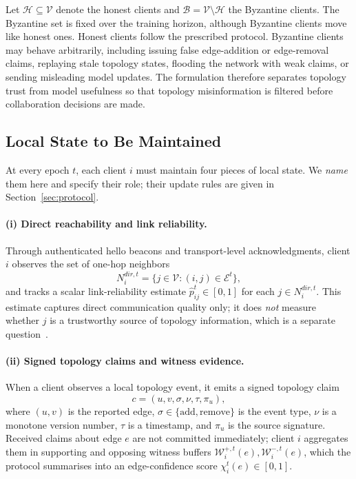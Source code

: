 \documentclass[journal]{IEEEtran}
\theoremstyle{definition}
\theoremstyle{remark}
\begin{document}
Let $\mathcal H \subseteq \mathcal V$ denote the honest clients and $\mathcal B = \mathcal V \setminus \mathcal H$ the Byzantine clients. The Byzantine set is fixed over the training horizon, although Byzantine clients move like honest ones. Honest clients follow the prescribed protocol. Byzantine clients may behave arbitrarily, including issuing false edge-addition or edge-removal claims, replaying stale topology states, flooding the network with weak claims, or sending misleading model updates. The formulation therefore separates topology trust from model usefulness so that topology misinformation is filtered before collaboration decisions are made.

\subsection{Local State to Be Maintained}
\label{sec:local_state}

At every epoch $t$, each client $i$ must maintain four pieces of local state. We \emph{name} them here and specify their role; their update rules are given in Section~\ref{sec:protocol}.

\paragraph{(i) Direct reachability and link reliability.}
Through authenticated hello beacons and transport-level acknowledgments, client $i$ observes the set of one-hop neighbors
$$
N_i^{dir,t} = \{j\in\mathcal V : (i,j)\in\mathcal E^t\},
$$
and tracks a scalar link-reliability estimate $\hat p_{ij}^t \in [0,1]$ for each $j\in N_i^{dir,t}$. This estimate captures direct communication quality only; it does \emph{not} measure whether $j$ is a trustworthy source of topology information, which is a separate question~\cite{ye2022decentralized}.

\paragraph{(ii) Signed topology claims and witness evidence.}
When a client observes a local topology event, it emits a signed topology claim
$$
c=(u,v,\sigma,\nu,\tau,\pi_u),
$$
where $(u,v)$ is the reported edge, $\sigma\in\{\mathrm{add},\mathrm{remove}\}$ is the event type, $\nu$ is a monotone version number, $\tau$ is a timestamp, and $\pi_u$ is the source signature. Received claims about edge $e$ are not committed immediately; client $i$ aggregates them in supporting and opposing witness buffers $\mathcal W_i^{+,t}(e),\mathcal W_i^{-,t}(e)$, which the protocol summarises into an edge-confidence score $\chi_i^t(e)\in[0,1]$.
\end{document}
